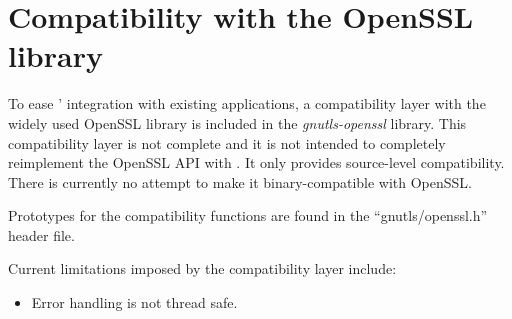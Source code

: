 \section{Compatibility with the OpenSSL library}

To ease \gnutls{}' integration with existing applications, a compatibility 
layer with the widely used OpenSSL library is included in the \emph{gnutls-openssl}
library. This compatibility layer is not complete and it is not 
intended to completely reimplement the OpenSSL API with \gnutls{}.
It only provides source-level compatibility. There is currently no
attempt to make it binary-compatible with OpenSSL.

Prototypes for the compatibility functions are found in the 
``gnutls/openssl.h'' header file.

Current limitations imposed by the compatibility layer include:

\begin{itemize}

\item Error handling is not thread safe.

\end{itemize}

